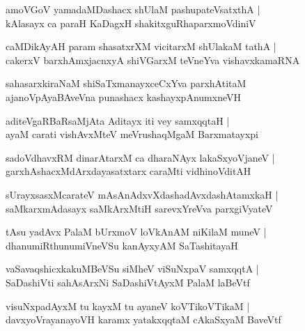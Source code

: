 \documentclass[twoside,12pt,openright]{book}
\newcounter{shloka}[chapter]
\begin{document}
\begin{shloka}%
amoVGoV yamadaMDashacx  shUlaM pashupateVsatxthA |\\
kAlasayx ca paraH KaDagxH shakitxguRhaparxmoVdiniV 
\end{shloka}

\begin{shloka}%
caMDikAyAH param shasatxrXM vicitarxM shUlakaM tathA |\\
cakerxV barxhAmxjacnxyA shiVGarxM teVneYva vishavxkamaRNA 
\end{shloka}

\begin{shloka}%
sahasarxkiraNaM shiSaTxmanayxceCxYva parxhAtitaM \\
ajanoVpAyaBAveVna punashacx kashayxpAnumxneVH
\end{shloka}

\begin{shloka}%
aditeVgaRBaRsaMjAta Aditayx iti vey samxqqtaH |\\
ayaM carati vishAvxMteV meVrushaqMgaM Barxmatayxpi
\end{shloka}

\begin{shloka}%
sadoVdhavxRM dinarAtarxM ca dharaNAyx lakaSxyoVjaneV |\\
garxhAshacxMdArxdayasatxtarx caraMti vidhinoVditAH
\end{shloka}

\begin{shloka}%
sUrayxsasxMcarateV mAsAnAdxvXdashadAvxdashAtamxkaH |\\
saMkarxmAdasayx saMkArxMtiH sarevxYreVva parxgiVyateV 
\end{shloka}

\begin{shloka}%
tAsu yadAvx PalaM bUrxmoV loVkAnAM niKilaM muneV |\\
dhanumiRthunumiVneVSu kanAyxyAM SaTashitayaH
\end{shloka}

\begin{shloka}%
vaSavaqshicxkakuMBeVSu siMheV viSuNxpaV samxqqtA |\\
SaDashiVti sahAsArxNi SaDashiVtAyxM PalaM laBeVtf
\end{shloka}

\begin{shloka}%
visuNxpadAyxM tu kayxM tu ayaneV koVTikoVTikaM |\\
davxyoVrayanayoVH karamx yatakxqqtaM cAkaSxyaM BaveVtf
\end{shloka}
\end{document}
